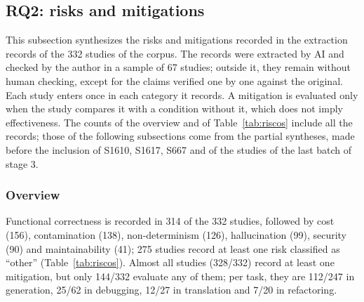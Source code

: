 \subsection{RQ2: risks and mitigations}\label{sec:qp2}

This subsection synthesizes the risks and mitigations recorded in the extraction records of the 332 studies of the corpus. The records were extracted by AI and checked by the author in a sample of 67 studies; outside it, they remain without human checking, except for the claims verified one by one against the original. Each study enters once in each category it records. A mitigation is evaluated only when the study compares it with a condition without it, which does not imply effectiveness. The counts of the overview and of Table~\ref{tab:riscos} include all the records; those
of the following subsections come from the partial syntheses, made before the inclusion of S1610, S1617, S667 and of the studies of the last batch of stage 3.

\subsubsection{Overview}

Functional correctness is recorded in 314 of the 332 studies, followed by cost (156), contamination (138), non-determinism (126), hallucination (99), security (90) and maintainability (41); 275 studies record at least one risk classified as ``other'' (Table~\ref{tab:riscos}).
Almost all studies (328/332) record at least one mitigation, but only 144/332 evaluate any of them; per task, they are 112/247 in generation, 25/62 in debugging, 12/27 in translation and 7/20 in refactoring.

